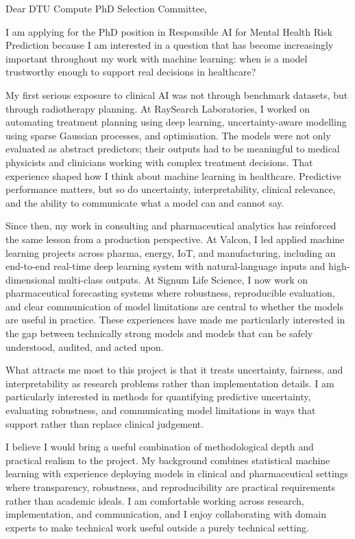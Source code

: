 \documentclass[11pt,a4paper]{moderncv}
\begin{document}
\makecvtitle
Dear DTU Compute PhD Selection Committee,

\vspace*{2em}
I am applying for the PhD position in Responsible AI for Mental Health Risk Prediction because I am interested in a question that has become increasingly important throughout my work with machine learning: when is a model trustworthy enough to support real decisions in healthcare?

\hspace*{2em}
My first serious exposure to clinical AI was not through benchmark datasets, but through radiotherapy planning. At RaySearch Laboratories, I worked on automating treatment planning using deep learning, uncertainty-aware modelling using sparse Gaussian processes, and optimisation. The models were not only evaluated as abstract predictors; their outputs had to be meaningful to medical physicists and clinicians working with complex treatment decisions. That experience shaped how I think about machine learning in healthcare. Predictive performance matters, but so do uncertainty, interpretability, clinical relevance, and the ability to communicate what a model can and cannot say.

\hspace*{2em}
Since then, my work in consulting and pharmaceutical analytics has reinforced the same lesson from a production perspective. At Valcon, I led applied machine learning projects across pharma, energy, IoT, and manufacturing, including an end-to-end real-time deep learning system with natural-language inputs and high-dimensional multi-class outputs. At Signum Life Science, I now work on pharmaceutical forecasting systems where robustness, reproducible evaluation, and clear communication of model limitations are central to whether the models are useful in practice. These experiences have made me particularly interested in the gap between technically strong models and models that can be safely understood, audited, and acted upon.

\hspace*{2em}
What attracts me most to this project is that it treats uncertainty, fairness, and interpretability as research problems rather than implementation details. I am particularly interested in methods for quantifying predictive uncertainty, evaluating robustness, and communicating model limitations in ways that support rather than replace clinical judgement.

\hspace*{2em}
I believe I would bring a useful combination of methodological depth and practical realism to the project. My background combines statistical machine learning with experience deploying models in clinical and pharmaceutical settings where transparency, robustness, and reproducibility are practical requirements rather than academic ideals. I am comfortable working across research, implementation, and communication, and I enjoy collaborating with domain experts to make technical work useful outside a purely technical setting.
\end{document}
